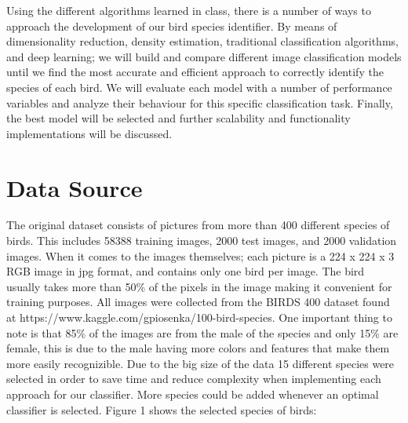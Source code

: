 \documentclass[11pt]{article}
\begin{document}
\begin{singlespace}
Using the different algorithms learned in class, there is a number of ways to approach the development of our bird species identifier. By means of dimensionality reduction, density estimation, traditional classification algorithms, and deep learning; we will build and compare different image classification models until we find the most accurate and efficient approach to correctly identify the species of each bird. We will evaluate each model with a number of performance variables and analyze their behaviour for this specific classification task. Finally, the best model will be selected and further scalability and functionality implementations will be discussed. 

\section{Data Source}

The original dataset consists of pictures from more than 400 different species of birds. This includes 58388 training images, 2000 test images, and 2000 validation images. When it comes to the images themselves; each picture is a 224 x 224 x 3 RGB image in jpg format, and contains only one bird per image. The bird usually takes more than 50\% of the pixels in the image making it convenient for training purposes. All images were collected from the BIRDS 400 dataset found at https://www.kaggle.com/gpiosenka/100-bird-species. One important thing to note is that 85\% of the images are from the male of the species and only 15\% are female, this is due to the male having more colors and features that make them more easily recognizible. Due to the big size of the data 15 different species were selected in order to save time and reduce complexity when implementing each approach for our classifier. More species could be added whenever an optimal classifier is selected. Figure 1 shows the selected species of birds:\\

\begin{figure}[h]
    \centering
    

\end{figure}
\end{singlespace}
\end{document}
